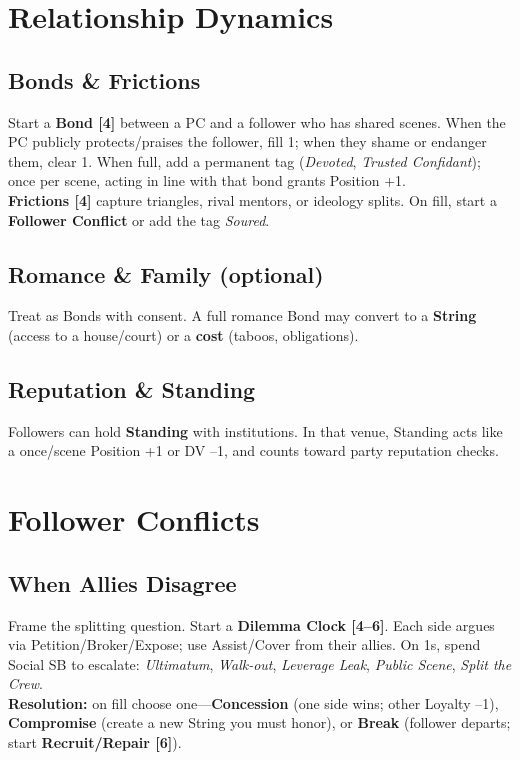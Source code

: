 \section{Relationship Dynamics}
\subsection{Bonds \& Frictions}
Start a \textbf{Bond [4]} between a PC and a follower who has shared scenes. When the PC publicly protects/praises the follower, fill 1; when they shame or endanger them, clear 1. When full, add a permanent tag (\emph{Devoted}, \emph{Trusted Confidant}); once per scene, acting in line with that bond grants Position +1.\\
\textbf{Frictions [4]} capture triangles, rival mentors, or ideology splits. On fill, start a \textbf{Follower Conflict} or add the tag \emph{Soured}.

\subsection{Romance \& Family (optional)}
Treat as Bonds with consent. A full romance Bond may convert to a \textbf{String} (access to a house/court) or a \textbf{cost} (taboos, obligations).

\subsection{Reputation \& Standing}
Followers can hold \textbf{Standing} with institutions. In that venue, Standing acts like a once/scene Position +1 or DV --1, and counts toward party reputation checks.

\section{Follower Conflicts}
\subsection{When Allies Disagree}
Frame the splitting question. Start a \textbf{Dilemma Clock [4--6]}. Each side argues via Petition/Broker/Expose; use Assist/Cover from their allies. On 1s, spend Social SB to escalate: \emph{Ultimatum}, \emph{Walk-out}, \emph{Leverage Leak}, \emph{Public Scene}, \emph{Split the Crew}.\\
\textbf{Resolution:} on fill choose one---\textbf{Concession} (one side wins; other Loyalty --1), \textbf{Compromise} (create a new String you must honor), or \textbf{Break} (follower departs; start \textbf{Recruit/Repair [6]}).

